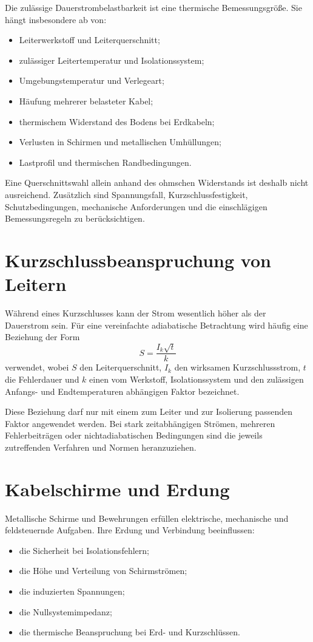Die zulässige Dauerstrombelastbarkeit ist eine thermische Bemessungsgröße.
Sie hängt insbesondere ab von:
\begin{itemize}
  \item Leiterwerkstoff und Leiterquerschnitt;
  \item zulässiger Leitertemperatur und Isolationssystem;
  \item Umgebungstemperatur und Verlegeart;
  \item Häufung mehrerer belasteter Kabel;
  \item thermischem Widerstand des Bodens bei Erdkabeln;
  \item Verlusten in Schirmen und metallischen Umhüllungen;
  \item Lastprofil und thermischen Randbedingungen.
\end{itemize}

Eine Querschnittswahl allein anhand des ohmschen Widerstands ist deshalb
nicht ausreichend. Zusätzlich sind Spannungsfall, Kurzschlussfestigkeit,
Schutzbedingungen, mechanische Anforderungen und die einschlägigen
Bemessungsregeln zu berücksichtigen.

\section{Kurzschlussbeanspruchung von Leitern}

Während eines Kurzschlusses kann der Strom wesentlich höher als der
Dauerstrom sein. Für eine vereinfachte adiabatische Betrachtung wird häufig
eine Beziehung der Form
\[
  S=\frac{I_k\sqrt{t}}{k}
\]
verwendet, wobei \(S\) den Leiterquerschnitt, \(I_k\) den wirksamen
Kurzschlussstrom, \(t\) die Fehlerdauer und \(k\) einen vom Werkstoff,
Isolationssystem und den zulässigen Anfangs- und Endtemperaturen abhängigen
Faktor bezeichnet.

Diese Beziehung darf nur mit einem zum Leiter und zur Isolierung passenden
Faktor angewendet werden. Bei stark zeitabhängigen Strömen, mehreren
Fehlerbeiträgen oder nichtadiabatischen Bedingungen sind die jeweils
zutreffenden Verfahren und Normen heranzuziehen.

\section{Kabelschirme und Erdung}

Metallische Schirme und Bewehrungen erfüllen elektrische, mechanische und
feldsteuernde Aufgaben. Ihre Erdung und Verbindung beeinflussen:
\begin{itemize}
  \item die Sicherheit bei Isolationsfehlern;
  \item die Höhe und Verteilung von Schirmströmen;
  \item die induzierten Spannungen;
  \item die Nullsystemimpedanz;
  \item die thermische Beanspruchung bei Erd- und Kurzschlüssen.
\end{itemize}

